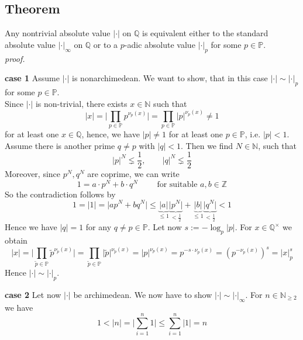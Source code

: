 \documentclass[12pt]{book}
\begin{document}
\begin{spacing}{1.3}
\subsection{Theorem} %
\titleformat{\subsection}{\normalfont\normalsize\bfseries}{}{0em}{#1 \thesubsection}
Any nontrivial absolute value $| \cdot|$ on $\mathbb{Q}$ is equivalent either to the standard absolute value $|\cdot|_{\infty}$ on $\mathbb{Q}$ or to a $p$-adic absolute value $|\cdot|_p$ for some $p \in \mathbb{P}$.\\
\textit{proof.}\
\begin{compactenum}
\item[\textbf{case 1}] Assume $| \cdot |$ is nonarchimedean. We want to show, that in this case $|\cdot | \sim |\cdot |_p$ for some $p \in \mathbb{P}$.\\
Since $| \cdot|$ is non-trivial, there exists $x \in \mathbb{N}$ such that $$|x|=\bigg \vert \prod_{p \in \mathbb{P}} p^{\nu_p(x)}\bigg \vert=\prod_{p \in \mathbb{P}} |p|^{\nu_p(x)} \neq 1 $$ for at least one $x \in \mathbb{Q}$, hence, we have $|p| \neq 1$ for at least one $p \in \mathbb{P}$, i.e. $|p|<1$.\\
Assume there is another prime $q \neq p$ with $|q|<1$. Then we find $N \in \mathbb{N}$, such that
$$\vert p \vert ^N \lneq \frac{1}{2}, \qquad \vert q \vert ^N \lneq \frac{1}{2}$$
Moreover, since $p^N, q^N$ are coprime, we  can write
$$1=a \cdot p^N+b \cdot q^N \qquad \textrm{ for suitable } a,b \in \mathbb{Z}$$
So the contradiction follows by
$$1=|1|=\big\vert ap^N+bq^N \big\vert \leqslant \underbrace{\vert a\vert}_{\leqslant 1} \underbrace{\big\vert p^N\big\vert}_{<\frac{1}{2}} + \underbrace{\vert b \vert}_{\leqslant 1} \underbrace{\big\vert q^N \big\vert}_{< \frac{1}{2}} < 1$$
Hence we have $|q|=1$ for any $q\neq p \in \mathbb{P}$. Let now $s:= -\log_p|p|$. For $x \in \mathbb{Q}^{\times}$ we obtain
$$|x|=\bigg\vert \prod_{\tilde{p}\in \mathbb{P}}\tilde{p}^{\nu_{\tilde{p}}(x)} \bigg\vert = \prod_{\tilde{p} \in \mathbb{P}} \vert \tilde{p}\vert ^{\nu_{\tilde{p}}(x)}=|p|^{\nu_p(x)}=p^{-s \cdot \nu_p(x)}=\left(p^{-\nu_p(x)}\right)^s=|x|_p^s$$
Hence $|\cdot| \sim |\cdot|_p$.
\item[\textbf{case 2}] Let now $|\cdot|$ be archimedean. We now have to show $|\cdot| \sim |\cdot|_{\infty}$.
For $n \in \mathbb{N}_{\geqslant 2}$ we have
$$1 < |n| = \bigg\vert\sum_{i=1}^n 1\bigg\vert \leqslant \sum_{i=1}^n \vert 1 \vert = n$$

\end{compactenum}
\end{spacing}
\end{document}
